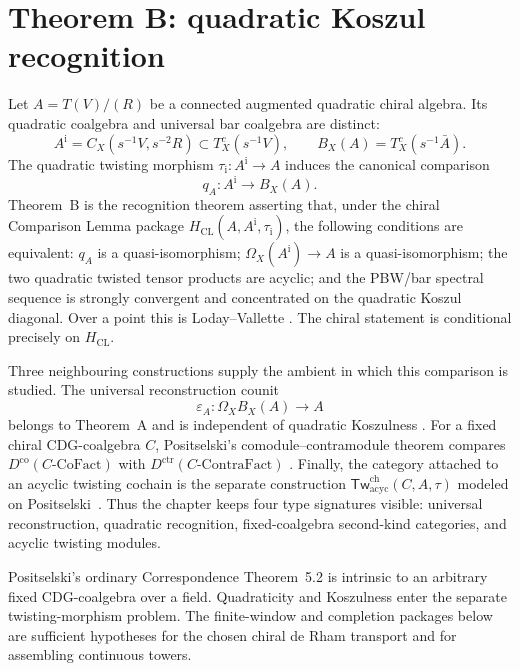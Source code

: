 \providecommand{\Kosz}{\mathsf{Kosz}}
\providecommand{\Conil}{\mathsf{Conil}}

\chapter{Theorem B: quadratic Koszul recognition}
\label{ch:theorem-B-scope-platonic}\label{ch:theorem-b-scope-platonic}

Let \(A=T(V)/(R)\) be a connected augmented quadratic chiral algebra.
Its quadratic coalgebra and universal bar coalgebra are distinct:
\[
 A^{\mathrm i}=C_X(s^{-1}V,s^{-2}R)\subset T_X^c(s^{-1}V),
 \qquad
 B_X(A)=T_X^c(s^{-1}\bar A).
\]
The quadratic twisting morphism
\(\tau_{\mathrm i}\colon A^{\mathrm i}\to A\) induces the canonical
comparison
\[
 q_A\colon A^{\mathrm i}\longrightarrow B_X(A).
\]
Theorem~B is the recognition theorem asserting that, under the chiral
Comparison Lemma package
\(H_{\mathrm{CL}}(A,A^{\mathrm i},\tau_{\mathrm i})\), the following
conditions are equivalent: \(q_A\) is a quasi-isomorphism;
\(\Omega_X(A^{\mathrm i})\to A\) is a quasi-isomorphism; the two
quadratic twisted tensor products are acyclic; and the PBW/bar
spectral sequence is strongly convergent and concentrated on the
quadratic Koszul diagonal.  Over a point this is Loday--Vallette
\cite[Theorems~2.3.2 and~3.4.6]{LV12}.  The chiral statement is
conditional precisely on \(H_{\mathrm{CL}}\).

Three neighbouring constructions supply the ambient in which this
comparison is studied.  The universal reconstruction counit
\[
 \varepsilon_A\colon\Omega_XB_X(A)\longrightarrow A
\]
belongs to Theorem~A and is independent of quadratic Koszulness
\cite[Corollary~2.3.4]{LV12}.  For a fixed chiral CDG-coalgebra \(C\),
Positselski's comodule--contramodule theorem compares
\(D^{\mathrm{co}}(C\text{-}\mathrm{CoFact})\) with
\(D^{\mathrm{ctr}}(C\text{-}\mathrm{ContraFact})\)
\cite[Theorem~5.2]{Positselski11}.  Finally, the category attached to
an acyclic twisting cochain is the separate construction
\(\mathsf{Tw}^{\mathrm{ch}}_{\mathrm{acyc}}(C,A,\tau)\) modeled on
Positselski~\cite[Theorem~6.5]{Positselski11}.  Thus the chapter
keeps four type signatures visible: universal reconstruction,
quadratic recognition, fixed-coalgebra second-kind categories, and
acyclic twisting modules.

Positselski's ordinary Correspondence Theorem~5.2 is intrinsic to an
arbitrary fixed CDG-coalgebra over a field.  Quadraticity and
Koszulness enter the separate twisting-morphism problem.  The
finite-window and completion packages below are sufficient hypotheses
for the chosen chiral de Rham transport and for assembling continuous
towers.

